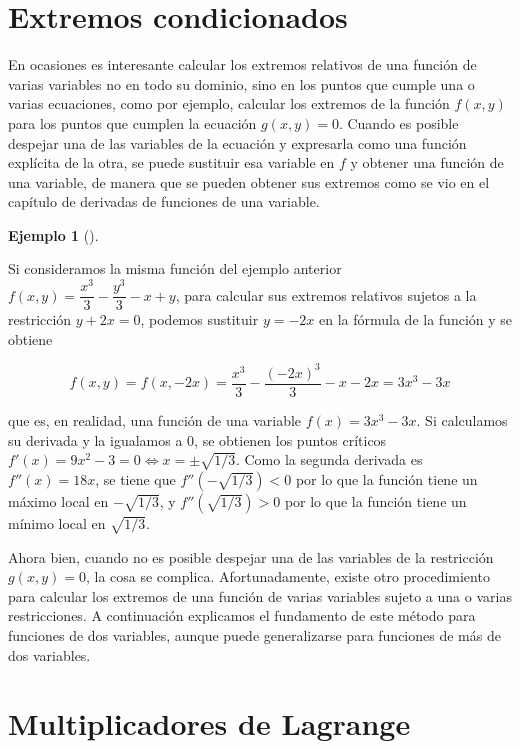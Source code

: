 \documentclass[
  a4paper,
]{scrreport}
\theoremstyle{definition}
\theoremstyle{plain}
\theoremstyle{plain}
\theoremstyle{definition}
\theoremstyle{definition}
\newtheorem{example}{Ejemplo}[chapter]
\theoremstyle{plain}
\theoremstyle{remark}
\begin{document}
\hypertarget{extremos-condicionados}{%
\section{Extremos condicionados}\label{extremos-condicionados}}

En ocasiones es interesante calcular los extremos relativos de una
función de varias variables no en todo su dominio, sino en los puntos
que cumple una o varias ecuaciones, como por ejemplo, calcular los
extremos de la función \(f(x,y)\) para los puntos que cumplen la
ecuación \(g(x,y)=0\). Cuando es posible despejar una de las variables
de la ecuación y expresarla como una función explícita de la otra, se
puede sustituir esa variable en \(f\) y obtener una función de una
variable, de manera que se pueden obtener sus extremos como se vio en el
capítulo de derivadas de funciones de una variable.

\begin{example}[]\protect\hypertarget{exm-extremos-condicionados}{}\label{exm-extremos-condicionados}

Si consideramos la misma función del ejemplo anterior
\(f(x,y)=\dfrac{x^3}{3}-\dfrac{y^3}{3}-x+y\), para calcular sus extremos
relativos sujetos a la restricción \(y+2x=0\), podemos sustituir
\(y=-2x\) en la fórmula de la función y se obtiene

\[
f(x,y) 
= f(x,-2x) 
= \frac{x^3}{3}-\frac{(-2x)^3}{3}-x-2x 
= 3x^3-3x 
\]

que es, en realidad, una función de una variable \(f(x)=3x^3-3x\). Si
calculamos su derivada y la igualamos a 0, se obtienen los puntos
críticos \(f'(x) = 9x^2-3 = 0 \Leftrightarrow x=\pm\sqrt{1/3}\). Como la
segunda derivada es \(f''(x) = 18x\), se tiene que
\(f''(-\sqrt{1/3})<0\) por lo que la función tiene un máximo local en
\(-\sqrt{1/3}\), y \(f''(\sqrt{1/3})>0\) por lo que la función tiene un
mínimo local en \(\sqrt{1/3}\).

\end{example}

Ahora bien, cuando no es posible despejar una de las variables de la
restricción \(g(x,y)=0\), la cosa se complica. Afortunadamente, existe
otro procedimiento para calcular los extremos de una función de varias
variables sujeto a una o varias restricciones. A continuación explicamos
el fundamento de este método para funciones de dos variables, aunque
puede generalizarse para funciones de más de dos variables.

\hypertarget{multiplicadores-de-lagrange}{%
\section{Multiplicadores de
Lagrange}\label{multiplicadores-de-lagrange}}
\end{document}
